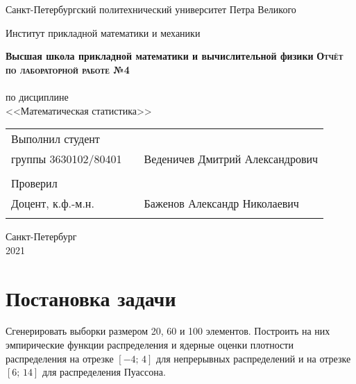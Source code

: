 \documentclass{article}
\begin{document}
\begin{titlepage}
  \begin{center}
    \large
    Санкт-Петербургский политехнический университет Петра Великого
    
    Институт прикладной математики и механики
    
    \textbf{Высшая школа прикладной математики и вычислительной физики}
    \vfill
    \textsc{\textbf{\Large{Отчёт по лабораторной работе №4}}}\\[5mm]
    \\ по дисциплине
    \\ <<Математическая статистика>>\\
\end{center}

\vfill

\begin{tabular}{l p{} l}
Выполнил студент \\группы 3630102/80401 && Веденичев Дмитрий Александрович \\
\\
Проверил\\Доцент, к.ф.-м.н.& \hspace{0pt} &   Баженов Александр Николаевич \\\\
\end{tabular}

\hfill \break
\hfill \break
\begin{center} Санкт-Петербург \\2021 \end{center}
\thispagestyle{empty}
\end{titlepage}
\newpage
\newpage
\begin{center}
    \setcounter{page}{2}
    \tableofcontents
\end{center}
\newpage
\begin{center}
    \setcounter{page}{3}
    \listoffigures
\end{center}

\newpage

\section {Постановка задачи}
Сгенерировать выборки размером 20, 60 и 100 элементов. Построить на них эмпирические функции распределения и ядерные оценки плотности распределения на отрезке $[-4;\,4]$ для непрерывных распределений и на отрезке $[6;\,14]$ для распределения Пуассона.
\end{document}
